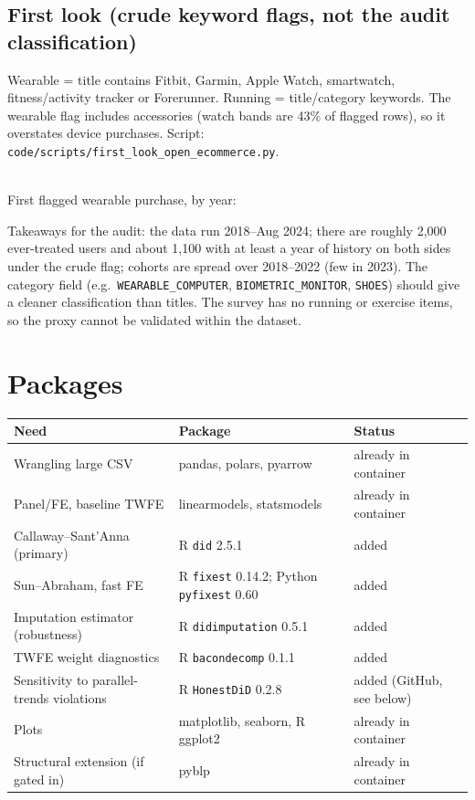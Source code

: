\documentclass[11pt]{article}
\begin{document}
\subsection*{First look (crude keyword flags, not the audit classification)}
Wearable = title contains Fitbit, Garmin, Apple Watch, smartwatch, fitness/activity tracker or Forerunner. Running =
title/category keywords. The wearable flag includes accessories (watch bands are 43\% of flagged rows), so it overstates device purchases.
Script: \texttt{code/scripts/first\_look\_open\_ecommerce.py}.

\begin{center}\small
\\[1ex]
First flagged wearable purchase, by year:\\[0.5ex]

\end{center}

\noindent Takeaways for the audit: the data run 2018--Aug 2024; there are roughly 2,000 ever-treated users and about
1,100 with at least a year of history on both sides under the crude flag; cohorts are spread over 2018--2022 (few in 2023).
The category field (e.g.\ \texttt{WEARABLE\_COMPUTER}, \texttt{BIOMETRIC\_MONITOR}, \texttt{SHOES}) should give a cleaner classification than titles.
The survey has no running or exercise items, so the proxy cannot be validated within the dataset.

\section{Packages}
\begin{center}\small
\begin{tabular}{p{4.6cm}p{5cm}p{5cm}}
\toprule
Need & Package & Status \\\midrule
Wrangling large CSV & pandas, polars, pyarrow & already in container \\
Panel/FE, baseline TWFE & linearmodels, statsmodels & already in container \\
Callaway--Sant'Anna (primary) & R \texttt{did} 2.5.1 & added \\
Sun--Abraham, fast FE & R \texttt{fixest} 0.14.2; Python \texttt{pyfixest} 0.60 & added \\
Imputation estimator (robustness) & R \texttt{didimputation} 0.5.1 & added \\
TWFE weight diagnostics & R \texttt{bacondecomp} 0.1.1 & added \\
Sensitivity to parallel-trends violations & R \texttt{HonestDiD} 0.2.8 & added (GitHub, see below) \\
Plots & matplotlib, seaborn, R ggplot2 & already in container \\
Structural extension (if gated in) & pyblp & already in container \\
\bottomrule
\end{tabular}
\end{center}
\end{document}
